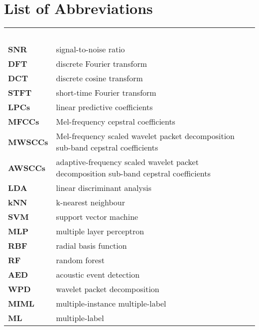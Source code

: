 

\chapter*{List of Abbreviations}


\renewcommand{\arraystretch}{1.4} 
\begin{longtable}{llr}
\multicolumn{3}{l}{\textbf{}\hspace{0.4\textwidth}~~}\\
\textbf{SNR}   &     signal-to-noise ratio\\
\textbf{DFT}   &                    discrete Fourier transform \\
\textbf{DCT}    &                    discrete cosine transform \\
\textbf{STFT} & short-time Fourier transform \\
\textbf{LPCs}	 &                   linear predictive coefficients \\
\textbf{MFCCs} &	       Mel-frequency cepstral coefficients \\
\textbf{MWSCCs} & Mel-frequency scaled wavelet packet decomposition sub-band cepstral coefficients \\
\textbf{AWSCCs} & adaptive-frequency scaled wavelet packet decomposition sub-band cepstral coefficients \\
\textbf{LDA}      &                  linear discriminant analysis \\
\textbf{kNN}	  &                  k-nearest neighbour \\
\textbf{SVM}	     &               support vector machine \\
\textbf{MLP}    &                   multiple layer perceptron \\
\textbf{RBF}    &                   radial basis function \\
\textbf{RF}     &                      random forest \\
\textbf{AED}	   &                 acoustic event detection \\
\textbf{WPD}     &                 wavelet packet decomposition \\
\textbf{MIML}   &                 multiple-instance multiple-label  \\ 
\textbf{ML}    &                      multiple-label \\
\end{longtable}

